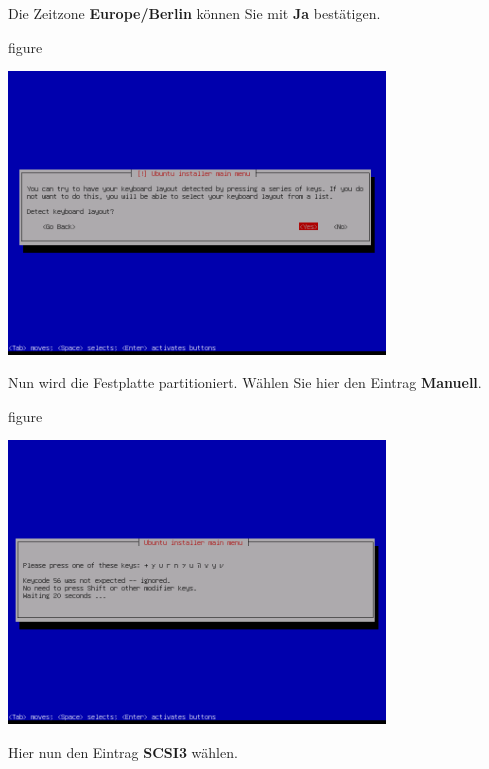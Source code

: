 \pagebreak
Die Zeitzone \textbf{Europe/Berlin} können Sie mit \textbf{Ja} bestätigen.

\begin{nofloat}{figure}
\begin{center}
\includegraphics[width=0.75\textwidth]{screenshots/06_ubuntu_install.png}
\end{center}
\end{nofloat}

Nun wird die Festplatte partitioniert. Wählen Sie hier den Eintrag \textbf{Manuell}.

\begin{nofloat}{figure}
\begin{center}
\includegraphics[width=0.75\textwidth]{screenshots/07_ubuntu_install.png}
\end{center}
\end{nofloat}

\pagebreak
Hier nun den Eintrag \textbf{SCSI3} wählen.

